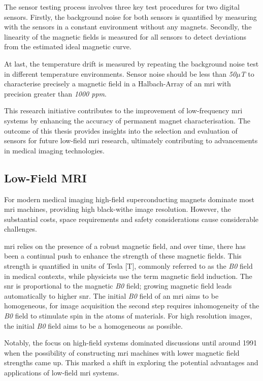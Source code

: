 The sensor testing process involves three key test procedures for two
digital sensors. Firstly, the background noise for both sensors is
quantified by measuring with the sensors in a constant environment
without any magnets. Secondly, the linearity of the magnetic fields is
measured for all sensors to detect deviations from the estimated ideal
magnetic curve.

At last, the temperature drift is measured by repeating the background
noise test in different temperature environments. Sensor noise should be
less than \emph{50\(\mu\)T} to characterise precisely a magnetic field
in a Halbach-Array of an \gls{mri} with precision greater than
\emph{1000 \gls{ppm}}.

This research initiative contributes to the improvement of low-frequency
\gls{mri} systems by enhancing the accuracy of permanent magnet
characterisation. The outcome of this thesis provides insights into the
selection and evaluation of sensors for future low-field \gls{mri}
research, ultimately contributing to advancements in medical imaging
technologies.

\hypertarget{low-field-mri}{%
\subsection{Low-Field MRI}\label{low-field-mri}}

For modern medical imaging high-field superconducting magnets dominate
most \gls{mri} machines, providing high black-withe image resolution.
However, the substantial costs, space requirements and safety
considerations cause considerable challenges.

\gls{mri} relies on the presence of a robust magnetic field, and over
time, there has been a continual push to enhance the strength of these
magnetic fields. This strength is quantified in units of Tesla {[}T{]},
commonly referred to as the \emph{B0} field in medical contexts, while
physicists use the term magnetic field induction. The \gls{snr} is
proportional to the magnetic \emph{B0} field; growing magnetic field
leads automatically to higher \gls{snr}. The initial \emph{B0} field of
an \gls{mri} aims to be homogeneous, for image acquisition the second
step requires inhomogeneity of the \emph{B0} field to stimulate spin in
the atoms of materials. For high resolution images, the initial
\emph{B0} field aims to be a homogeneous as possible.

Notably, the focus on high-field systems dominated discussions until
around 1991 when the possibility of constructing \gls{mri} machines with
lower magnetic field strengths came up. This marked a shift in exploring
the potential advantages and applications of low-field \gls{mri}
systems. 

